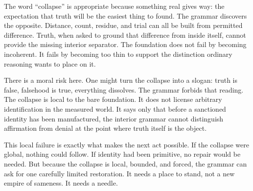 The word ``collapse'' is appropriate because something real gives way:
the expectation that truth will be the easiest thing to found. The
grammar discovers the opposite. Distance, count, residue, and trial can
all be built from permitted difference. Truth, when asked to ground that
difference from inside itself, cannot provide the missing interior
separator. The foundation does not fail by becoming incoherent. It fails
by becoming too thin to support the distinction ordinary reasoning wants
to place on it.

There is a moral risk here. One might turn the collapse into a slogan:
truth is false, falsehood is true, everything dissolves. The grammar
forbids that reading. The collapse is local to the bare foundation. It
does not license arbitrary identification in the measured world. It says
only that before a sanctioned identity has been manufactured, the
interior grammar cannot distinguish affirmation from denial at the
point where truth itself is the object.

This local failure is exactly what makes the next act possible. If the
collapse were global, nothing could follow. If identity had been
primitive, no repair would be needed. But because the collapse is local,
bounded, and forced, the grammar can ask for one carefully limited
restoration. It needs a place to stand, not a new empire of sameness. It
needs a needle.
